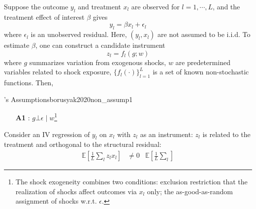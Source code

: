 \documentclass[twoside]{article}
\begin{document}
Suppose the outcome $y_l$ and treatment $x_l$ are observed for $l=1,\cdots,L$, and the treatment effect of interest $\beta$ gives $$ y_l = \beta x_l + \epsilon_l $$
where $\epsilon_l$ is an unobserved residual. Here, $\left(y_l,x_l\right)$ are not assumed to be i.i.d. To estimate $\beta$, one can construct a candidate instrument $$z_l = f_l(g;w)$$
where $g$ summarizes variation from exogenous shocks, $w$ are predetermined variables related to shock exposure, $\{f_l(\cdot)\}^L_{l=1}$ is a set of known non-stochastic functions. Then, 
\begin{assumption}{\citet{borusyak2020non}'s Assumptions}{borusyak2020non_assump1}
    \begin{itemize}
        \item[\textbf{A1}] : $g\bot \epsilon\mid w$\footnote{The shock exogeneity combines two conditions: exclusion restriction that the realization of shocks affect outcomes via $x_l$ only; the as-good-as-random assignment of shocks w.r.t. $\epsilon$.}
    \end{itemize}
\end{assumption}

Consider an IV regression of $y_l$ on $x_l$ with $z_l$ as an instrument: $z_l$ is related to the treatment and orthogonal to the structural residual:
\begin{align*}
    \mathbb{E}\left[\frac{1}{L}\sum_l z_lx_l\right]&\neq 0 & \mathbb{E}\left[\frac{1}{L}\sum_l\right]
\end{align*}

\newpage


\end{document}
